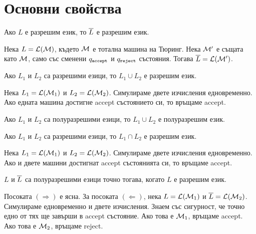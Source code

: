 \section{Основни свойства}

\begin{prop}
  Ако $L$ е разрешим език, то $\overline{L}$ е разрешим език.
\end{prop}
\begin{hint}
  Нека $L = \mathcal{L}(\mathcal{M})$, където $\mathcal{M}$ е тотална машина на Тюринг.
  Нека $\mathcal{M}'$ е същата като $\mathcal{M}$, само със сменени $q_{\texttt{accept}}$ и $q_{\texttt{reject}}$ състояния.
  Тогава $\overline{L} = \mathcal{L}(\mathcal{M}')$.
\end{hint}

\begin{prop}
  Ако $L_1$ и $L_2$ са разрешими езици, то $L_1 \cup L_2$ е разрешим език.
\end{prop}
\begin{hint}
  Нека $L_1 = \mathcal{L}(\mathcal{M}_1)$ и $L_2 = \mathcal{L}(\mathcal{M}_2)$.
  Симулираме двете изчисления едновременно.
  Ако едната машина достигне accept състоянието си, то връщаме accept.
\end{hint}

\begin{prop}
  Ако $L_1$ и $L_2$ са полуразрешими езици, то $L_1 \cup L_2$ е полуразрешим език.
\end{prop}

\begin{prop}
  Ако $L_1$ и $L_2$ са разрешими езици, то $L_1 \cap L_2$ е разрешим език.
\end{prop}
\begin{hint}
  Нека $L_1 = \mathcal{L}(\mathcal{M}_1)$ и $L_2 = \mathcal{L}(\mathcal{M}_2)$.
  Симулираме двете изчисления едновременно.
  Ако и двете машини достигнат accept състоянията си, то връщаме accept.
\end{hint}

\begin{framed}
  \begin{thm}
    $L$ и $\overline{L}$ са полуразрешими езици точно тогава, когато $L$ е разрешим език.
  \end{thm}
\end{framed}
\begin{hint}
  Посоката $(\Rightarrow)$ е ясна.
  За посоката $(\Leftarrow)$, нека $L = \mathcal{L}(\mathcal{M}_1)$ и $\overline{L} = \mathcal{L}(\mathcal{M}_2)$.
  Симулираме едновременно и двете изчисления.
  Знаем със сигурност, че точно едно от тях ще завърши в accept състояние.
  Ако това е $\mathcal{M}_1$, връщаме accept.
  Ако това е $\mathcal{M}_2$, връщаме reject.
\end{hint}

